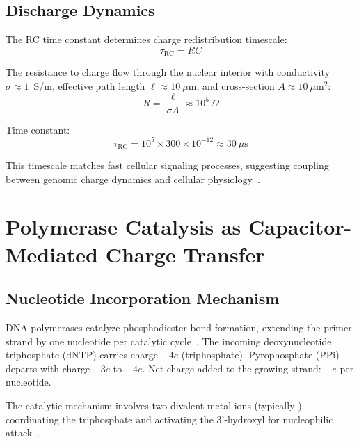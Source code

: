 \documentclass[twocolumn,aps,prb,superscriptaddress,longbibliography,floatfix]{revtex4-2}
\theoremstyle{remark}
\begin{document}
\subsection{Discharge Dynamics}

The RC time constant determines charge redistribution timescale:
\begin{equation}
\tau_\text{RC} = RC
\end{equation}

The resistance to charge flow through the nuclear interior with
conductivity $\sigma \approx 1$~S/m, effective path length
$\ell \approx 10~\mu$m, and cross-section $A \approx 10~\mu\text{m}^2$:
\begin{equation}
R = \frac{\ell}{\sigma A} \approx 10^5~\Omega
\end{equation}

Time constant:
\begin{equation}
\tau_\text{RC} = 10^5 \times 300 \times 10^{-12} \approx 30~\mu\text{s}
\end{equation}

This timescale matches fast cellular signaling processes, suggesting
coupling between genomic charge dynamics and cellular
physiology~\cite{Bhalla1999}.

\section{Polymerase Catalysis as Capacitor-Mediated Charge Transfer}
\label{sec:polymerase}

\subsection{Nucleotide Incorporation Mechanism}

DNA polymerases catalyze phosphodiester bond formation, extending the
primer strand by one nucleotide per catalytic cycle~\cite{Kornberg1992}.
The incoming deoxynucleotide triphosphate (dNTP) carries charge $-4e$
(triphosphate). Pyrophosphate (PPi) departs with charge $-3e$ to $-4e$.
Net charge added to the growing strand: $-e$ per nucleotide.

The catalytic mechanism involves two divalent metal ions (typically
) coordinating the triphosphate and activating the
3'-hydroxyl for nucleophilic attack~\cite{Steitz1998}.
\end{document}
